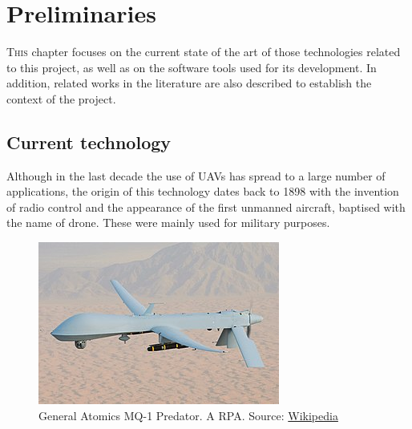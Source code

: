 \chapter{Preliminaries}
\label{ch:Preliminaries}
\lettrine[lraise=-0.1, lines=2, loversize=0.2]{T}{his} chapter focuses on the current state of the art of those technologies related to this project, as well as on the software tools used for its development. In addition, related works in the literature are also described to establish the context of the project.

\section{Current technology}
\label{sec:CurrentTechnology}
Although in the last decade the use of \glspl{UAV} has spread to a large number of applications, the origin of this technology dates back to 1898 with the invention of radio control and the appearance of the first unmanned aircraft, baptised with the name of drone. These were mainly used for military purposes.


\begin{figure}[htbp]
    \centering
    \includegraphics[width=0.6\linewidth]
    {Preliminaries/figures/Predator.jpg}
    \caption{General Atomics MQ-1 Predator. A \gls{RPA}. Source: \href{https://en.wikipedia.org/wiki/General_Atomics_MQ-1_Predator}{Wikipedia}}
    \label{fig:predator}
\end{figure}

